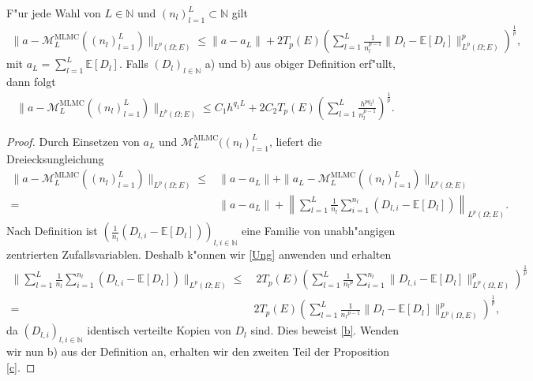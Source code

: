 \begin{prop}
F"ur jede Wahl von $L\in\mathbb{N}$ und $(n_l)_{l=1}^L\subset\mathbb{N}$ gilt
\begin{align}\label{b}
\|a-\mathcal{M}_L^{\text{MLMC}}((n_l)_{l=1}^L)\|_{L^p(\Omega;E)}\leq\|a-a_L\|+2T_p(E)\left(\sum_{l=1}^L\frac{1}{n_l^{p-1}}\|D_l-\mathbb{E}[D_l]\|^p_{L^p(\Omega;E)}\right)^{\frac{1}{p}},
\end{align}
mit $a_L=\sum_{l=1}^L\mathbb{E}[D_l]$. Falls $(D_l)_{l\in\mathbb{N}}$ a) und b) aus obiger Definition erf"ullt, dann folgt
\begin{align}\label{c}
\|a-\mathcal{M}_L^{\text{MLMC}}((n_l)_{l=1}^L)\|_{L^p(\Omega;E)}\leq C_1 h^{q_1L}+2C_2 T_p(E)\left(\sum_{l=1}^L \frac{h^{p q_2 l}}{n_l^{p-1}}\right)^{\frac{1}{p}}.
\end{align}
\end{prop}
\begin{proof}
Durch Einsetzen von $a_L$ und $\mathcal{M}_L^{\text{MLMC}}((n_l)_{l=1}^L$, liefert die Dreiecksungleichung
\begin{align*}
\|a-\mathcal{M}_L^{\text{MLMC}}((n_l)_{l=1}^L)\|_{L^p(\Omega;E)}\leq&
\|a-a_L\|+\|a_L-\mathcal{M}_L^{\text{MLMC}}((n_l)_{l=1}^L)\|_{L^p(\Omega;E)}\\
=&\|a-a_L\|+\left\|\sum_{l=1}^L \frac{1}{n_l}\sum_{i=1}^{n_l}(D_{l,i}-\mathbb{E}[D_l])\right\|_{L^p(\Omega;E)}.
\end{align*}
Nach Definition ist $(\frac{1}{n_l}(D_{l,i}-\mathbb{E}[D_l]))_{l,i\in\mathbb{N}}$ eine Familie von unabh"angigen zentrierten Zufallsvariablen. Deshalb k"onnen wir \ref{Ung} anwenden und erhalten
\begin{align*}
\Big\|\sum_{l=1}^L \frac{1}{n_l}\sum_{i=1}^{n_l}(D_{l,i}-\mathbb{E}[D_l])\Big\|_{L^p(\Omega;E)}\leq&\ 2T_p(E)\left(\sum_{l=1}^L\frac{1}{{n_l}^p}\sum_{i=1}^{n_l} \| D_{l,i}-\mathbb{E}[D_l]\|^p_{L^p(\Omega,E)}\right)^{\frac{1}{p}}\\
=& 2T_p(E)\left(\sum_{l=1}^L\frac{1}{{n_l}^{p-1}} \| D_{l}-\mathbb{E}[D_l]\|^p_{L^p(\Omega,E)}\right)^{\frac{1}{p}},
\end{align*}
da $(D_{l,i})_{l,i\in\mathbb{N}}$  identisch verteilte Kopien von $D_l$ sind. Dies beweist \eqref{b}. Wenden wir nun b) aus der Definition an, erhalten wir den zweiten Teil der Proposition \eqref{c}.
\end{proof}